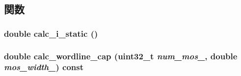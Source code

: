 \subsection{関数}
\hypertarget{classWordlineUnit_a0027807356ac4ca07fe2e593234eb884}{
\subsubsection[{calc\_\-i\_\-static}]{\setlength{\rightskip}{0pt plus 5cm}double calc\_\-i\_\-static ()}}
\label{classWordlineUnit_a0027807356ac4ca07fe2e593234eb884}
\hypertarget{classWordlineUnit_ab84b49850d493b5151c5fc24bcd5826b}{
\subsubsection[{calc\_\-wordline\_\-cap}]{\setlength{\rightskip}{0pt plus 5cm}double calc\_\-wordline\_\-cap ({\bf uint32\_\-t} {\em num\_\-mos\_\-}, \/  double {\em mos\_\-width\_\-}) const}}
\label{classWordlineUnit_ab84b49850d493b5151c5fc24bcd5826b}



